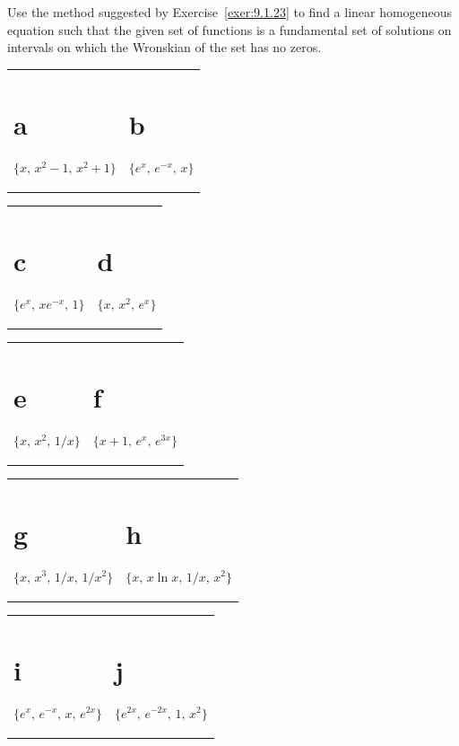 \begin{exerciselist}
  \item\label{exer:9.1.24} Use the method suggested by Exercise~\ref{exer:9.1.23} to find a linear
        homogeneous equation such that the given set of functions is a fundamental set of solutions
        on intervals on which the Wronskian of the set has no zeros.

  \begin{tabular}[t]{@{}p{168pt}@{}p{168pt}}
    \part{a} $\{x,\,x^{2}-1,\,x^{2}+1\}$ & \part{b} $\{e^{x},\,e^{-x},\,x\}$
  \end{tabular}

  \begin{tabular}[t]{@{}p{168pt}@{}p{168pt}}
    \part{c} $\{e^{x},\,xe^{-x},\,1\}$ & \part{d} $\{x,\,x^{2},\,e^{x}\}$
  \end{tabular}

  \begin{tabular}[t]{@{}p{168pt}@{}p{168pt}}
    \part{e} $\{x,\,x^{2},\,1/x\}$ & \part{f} $\{x+1,\,e^{x},\,e^{3x}\}$
  \end{tabular}

  \begin{tabular}[t]{@{}p{168pt}@{}p{168pt}}
    \part{g} $\{x,\,x^{3},\,1/x,\,1/x^{2}\}$ & \part{h} $\{x,\,x\ln x,\,1/x,\,x^{2}\}$
  \end{tabular}

  \begin{tabular}[t]{@{}p{168pt}@{}p{168pt}}
    \part{i} $\{e^{x},\,e^{-x},\,x,\,e^{2x}\}$ & \part{j} $\{e^{2x},\,e^{-2x},\,1,\,x^{2}\}$
  \end{tabular}
\end{exerciselist}
